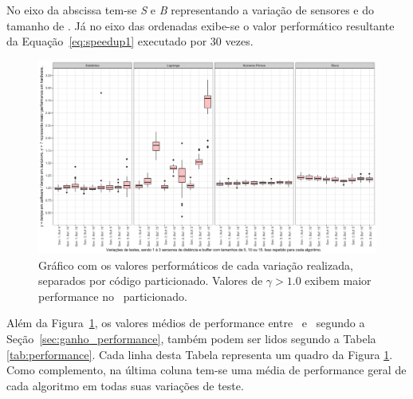         No eixo da abscissa tem-se \textit{S} e \textit{B} representando a variação de sensores e do tamanho de \buffer.
        Já no eixo das ordenadas exibe-se o valor performático resultante da Equação~\ref{eq:speedup1} executado por 30 vezes.
        
        \begin{figure}[h] \centering
            \vspace{-0.5em}
            \includegraphics[width=1\textwidth]{img/performance.png}
            \caption{Gráfico com os valores performáticos de cada variação realizada, separados por código particionado. Valores de $\gamma > 1.0 $ exibem maior performance no \hardware\ particionado.}
            \label{fig:performance}
        \end{figure}
    
        Além da Figura~\ref{fig:performance}, os valores médios de performance entre \software\ e \hardware\ segundo a Seção~\ref{sec:ganho_performance}, também podem ser lidos segundo a Tabela \ref{tab:performance}.
        Cada linha desta Tabela representa um quadro da Figura \ref{fig:performance}.
        Como complemento, na última coluna tem-se uma média de performance geral de cada algoritmo em todas suas variações de teste.
    
